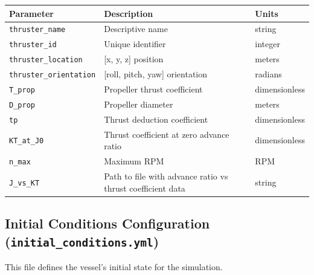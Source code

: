 \documentclass[
  letterpaper,
  DIV=11,
  numbers=noendperiod]{scrreprt}
\begin{document}
\begin{longtable}[]{@{}
  >{\raggedright\arraybackslash}p{}
  >{\raggedright\arraybackslash}p{}
  >{\raggedright\arraybackslash}p{}@{}}
\toprule\noalign{}
\begin{minipage}[b]{\linewidth}\raggedright
Parameter
\end{minipage} & \begin{minipage}[b]{\linewidth}\raggedright
Description
\end{minipage} & \begin{minipage}[b]{\linewidth}\raggedright
Units
\end{minipage} \\
\midrule\noalign{}
\endhead
\bottomrule\noalign{}
\endlastfoot
\texttt{thruster\_name} & Descriptive name & string \\
\texttt{thruster\_id} & Unique identifier & integer \\
\texttt{thruster\_location} & {[}x, y, z{]} position & meters \\
\texttt{thruster\_orientation} & {[}roll, pitch, yaw{]} orientation &
radians \\
\texttt{T\_prop} & Propeller thrust coefficient & dimensionless \\
\texttt{D\_prop} & Propeller diameter & meters \\
\texttt{tp} & Thrust deduction coefficient & dimensionless \\
\texttt{KT\_at\_J0} & Thrust coefficient at zero advance ratio &
dimensionless \\
\texttt{n\_max} & Maximum RPM & RPM \\
\texttt{J\_vs\_KT} & Path to file with advance ratio vs thrust
coefficient data & string \\
\end{longtable}

\subsection*{\texorpdfstring{Initial Conditions Configuration
(\texttt{initial\_conditions.yml})}{Initial Conditions Configuration (initial\_conditions.yml)}}\label{initial-conditions-configuration-initial_conditions.yml}

This file defines the vessel's initial state for the simulation.
\end{document}
